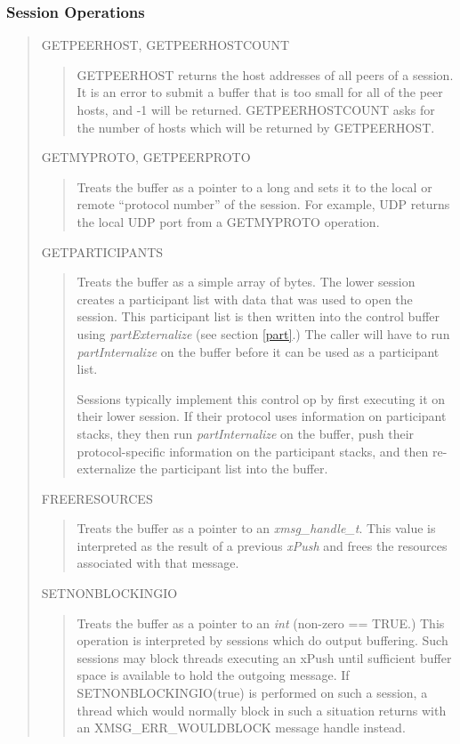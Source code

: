\subsubsection{ Session Operations }
\begin{quote}
	GETPEERHOST, GETPEERHOSTCOUNT
\begin{quote}
GETPEERHOST returns the host addresses of all peers of a session.  It
is an error to submit a buffer that is too small for all of the peer
hosts, and -1 will be returned.  GETPEERHOSTCOUNT asks for the number
of hosts which will be returned by GETPEERHOST.

\end{quote}
	GETMYPROTO, GETPEERPROTO
\begin{quote}
Treats the buffer as a pointer to a long and sets it to the local or
remote ``protocol number'' of the session.  For example, UDP returns
the local UDP port from a GETMYPROTO operation.

\end{quote}
	GETPARTICIPANTS
\begin{quote}
Treats the buffer as a simple array of bytes.  The lower session
creates a participant list with data that was used to open the
session.  This participant list is then written into the control
buffer using {\em partExternalize} (see section \ref{part}.)  The
caller will have to run {\em partInternalize} on the buffer before it
can be used as a participant list.

Sessions typically implement this control op by first executing it on their
lower session.  If their protocol uses information on participant
stacks, they then run {\em partInternalize} on the buffer, push their
protocol-specific information on the participant stacks, and then
re-externalize the participant list into the buffer.

\end{quote}
	FREERESOURCES
\begin{quote}
Treats the buffer as a pointer to an {\em xmsg\_handle\_t}.  This
value is interpreted as the result of a previous {\em xPush} and frees
the resources associated with that message.

\end{quote}

	SETNONBLOCKINGIO
\begin{quote}
Treats the buffer as a pointer to an {\em int} (non-zero == TRUE.)  
This operation is interpreted by sessions which do output buffering.
Such sessions may block threads executing an xPush until sufficient
buffer space is available to hold the outgoing message.  If
SETNONBLOCKINGIO(true) is performed on such a session, a thread which
would normally block in such a situation returns with an XMSG\_ERR\_WOULDBLOCK message
handle instead.

\end{quote}


\end{quote}

